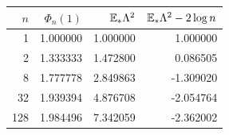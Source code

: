 \begin{tabular}{rrrr}
\toprule
$n$ & $\Phi_n(1)$ & $\mathbb E_*\Lambda^2$ & $\mathbb E_*\Lambda^2-2\log n$\\
\midrule
1 & 1.000000 & 1.000000 & 1.000000 \\
2 & 1.333333 & 1.472800 & 0.086505 \\
8 & 1.777778 & 2.849863 & -1.309020 \\
32 & 1.939394 & 4.876708 & -2.054764 \\
128 & 1.984496 & 7.342059 & -2.362002 \\
\bottomrule
\end{tabular}
